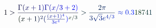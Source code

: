 \documentclass[12pt]{article}
\begin{document}
\makeatletter
\renewcommand*{\@textcolor}[3]{%
  \protect\leavevmode
  \begingroup
    \color#1{#2}#3%
  \endgroup
}
\makeatother
\begin{displaymath}
\mathcolor[RGB]{0,0,15}{1} \mathcolor[RGB]{0,0,30}{>} \mathcolor[RGB]{0,0,45}{\frac { \mathcolor[RGB]{0,0,60}{\Gamma} \mathcolor[RGB]{0,0,75}{(} \mathcolor[RGB]{0,0,90}{x} \mathcolor[RGB]{0,0,105}{+} \mathcolor[RGB]{0,0,120}{1} \mathcolor[RGB]{0,0,135}{)} \mathcolor[RGB]{0,0,150}{\Gamma} \mathcolor[RGB]{0,0,165}{(} \mathcolor[RGB]{0,0,180}{x} \mathcolor[RGB]{0,0,195}{/} \mathcolor[RGB]{0,0,210}{3} \mathcolor[RGB]{0,0,225}{+} \mathcolor[RGB]{0,0,240}{2} \mathcolor[RGB]{0,0,255}{)} } { \mathcolor[RGB]{0,15,0}{(} \mathcolor[RGB]{0,15,15}{x} \mathcolor[RGB]{0,15,30}{+} \mathcolor[RGB]{0,15,45}{1} \mathcolor[RGB]{0,15,60}{)} ^ { \mathcolor[RGB]{0,15,75}{2} } \mathcolor[RGB]{0,15,90}{(} \mathcolor[RGB]{0,15,105}{\frac { \mathcolor[RGB]{0,15,120}{(} \mathcolor[RGB]{0,15,135}{x} \mathcolor[RGB]{0,15,150}{+} \mathcolor[RGB]{0,15,165}{1} \mathcolor[RGB]{0,15,180}{)} ^ { \mathcolor[RGB]{0,15,195}{4} } } { \mathcolor[RGB]{0,15,210}{3} \mathcolor[RGB]{0,15,225}{e} ^ { \mathcolor[RGB]{0,15,240}{4} } } } \mathcolor[RGB]{0,15,255}{)} ^ { \mathcolor[RGB]{0,30,0}{x} \mathcolor[RGB]{0,30,15}{/} \mathcolor[RGB]{0,30,30}{3} } } } \mathcolor[RGB]{0,30,45}{>} \mathcolor[RGB]{0,30,60}{\frac { \mathcolor[RGB]{0,30,75}{2} \mathcolor[RGB]{0,30,90}{\pi} } { \mathcolor[RGB]{0,30,105}{3} \mathcolor[RGB]{0,30,120}{\sqrt { \mathcolor[RGB]{0,30,135}{3} } } \mathcolor[RGB]{0,30,150}{e} ^ { \mathcolor[RGB]{0,30,165}{4} \mathcolor[RGB]{0,30,180}{/} \mathcolor[RGB]{0,30,195}{3} } } } \mathcolor[RGB]{0,30,210}{\approx} \mathcolor[RGB]{0,30,225}{0} \mathcolor[RGB]{0,30,240}{.} \mathcolor[RGB]{0,30,255}{3} \mathcolor[RGB]{0,45,0}{1} \mathcolor[RGB]{0,45,15}{8} \mathcolor[RGB]{0,45,30}{7} \mathcolor[RGB]{0,45,45}{4} \mathcolor[RGB]{0,45,60}{1}
\end{displaymath}
\end{document}
